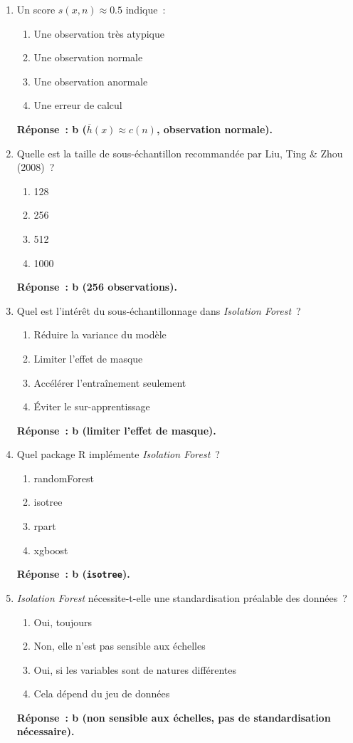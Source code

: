 \documentclass[a4paper,11pt]{article}
\theoremstyle{definition}
\theoremstyle{remark}
\begin{document}
\begin{enumerate}
  \item Un score $s(x,n) \approx 0.5$ indique~:
    \begin{enumerate}
      \item Une observation tr\`es atypique
      \item Une observation normale
      \item Une observation anormale
      \item Une erreur de calcul
    \end{enumerate}
    \textbf{R\'eponse~: b ($\overline{h}(x) \approx c(n)$, observation
    normale).}

  \item Quelle est la taille de sous-\'echantillon recommand\'ee par
    Liu, Ting \& Zhou (2008)~?
    \begin{enumerate}
      \item 128
      \item 256
      \item 512
      \item 1000
    \end{enumerate}
    \textbf{R\'eponse~: b (256 observations).}

  \item Quel est l'int\'er\^et du sous-\'echantillonnage dans
    \emph{Isolation Forest}~?
    \begin{enumerate}
      \item R\'eduire la variance du mod\`ele
      \item Limiter l'effet de masque
      \item Acc\'el\'erer l'entra\^inement seulement
      \item \'Eviter le sur-apprentissage
    \end{enumerate}
    \textbf{R\'eponse~: b (limiter l'effet de masque).}

  \item Quel package R impl\'emente \emph{Isolation Forest}~?
    \begin{enumerate}
      \item randomForest
      \item isotree
      \item rpart
      \item xgboost
    \end{enumerate}
    \textbf{R\'eponse~: b (\texttt{isotree}).}

  \item \emph{Isolation Forest} n\'ecessite-t-elle une standardisation
    pr\'ealable des donn\'ees~?
    \begin{enumerate}
      \item Oui, toujours
      \item Non, elle n'est pas sensible aux \'echelles
      \item Oui, si les variables sont de natures diff\'erentes
      \item Cela d\'epend du jeu de donn\'ees
    \end{enumerate}
    \textbf{R\'eponse~: b (non sensible aux \'echelles, pas de
    standardisation n\'ecessaire).}


\end{enumerate}
\end{document}
